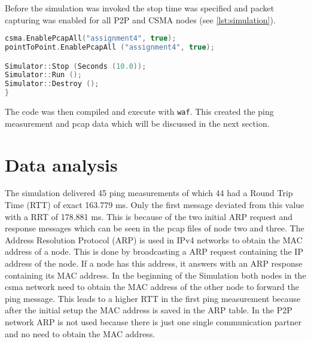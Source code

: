\documentclass[parskip=full]{scrartcl}
\begin{document}
Before the simulation was invoked the stop time was specified and packet capturing was enabled for all P2P and CSMA nodes (see \cref{lst:simulation}).

\begin{lstlisting}[language=c++, frame=single , captionpos=b, caption={pcap and simulation start}, label=lst:simulation]
csma.EnablePcapAll("assignment4", true);
pointToPoint.EnablePcapAll ("assignment4", true);

Simulator::Stop (Seconds (10.0));
Simulator::Run ();
Simulator::Destroy ();
}
\end{lstlisting}

The code was then compiled and execute with \verb|waf|. This created the ping measurement and pcap data which will be discussed in the next section. 

\section{Data analysis} \label{sec:data}

% 

The simulation delivered 45 ping measurements of which 44 had a Round Trip Time (RTT) of exact 163.779 ms. 
Only the first message deviated from this value with a RRT of 178.881 ms. 
This is because of the two initial ARP request and response messages which can be seen in the pcap files of node two and three.
The Address Resolution Protocol (ARP) is used in IPv4 networks to obtain the MAC address of a node. 
This is done by broadcasting a ARP request containing the IP address of the node. 
If a node has this address, it answers with an ARP response containing its MAC address.
In the beginning of the Simulation both nodes in the csma network need to obtain the MAC address of the other node to forward the ping message.
This leads to a higher RTT in the first ping measurement because after the initial setup the MAC address is saved in the ARP table.
In the P2P network ARP is not used because there is just one single communication partner and no need to obtain the MAC address.
\end{document}
